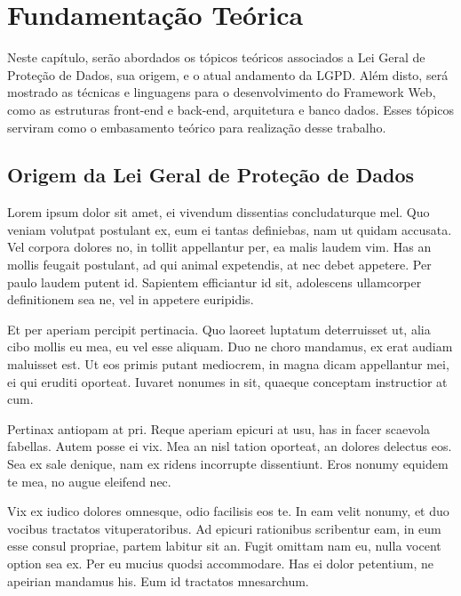 \documentclass[
	12pt,				%
	openright,			%
	oneside,			%
	a4paper,			%
	english,			%
	french,				%
	spanish,			%
	brazil,				%
	]{abntex2}
\begin{document}
\setcounter{chapter}{1}
\chapter{Fundamentação Teórica}
\label{ch: fundamentacao teorica}

Neste capítulo, serão abordados os tópicos teóricos associados a Lei Geral de Proteção de Dados, sua origem, e o atual andamento da LGPD. Além disto, será mostrado as técnicas e linguagens para o desenvolvimento do Framework Web, como as estruturas front-end e back-end, arquitetura e banco dados.
Esses tópicos serviram como o embasamento teórico para realização desse trabalho.

\section{Origem da Lei Geral de Proteção de Dados}
\label{sec: Origem LGPD}

Lorem ipsum dolor sit amet, ei vivendum dissentias concludaturque mel. Quo veniam volutpat postulant ex, eum ei tantas definiebas, nam ut quidam accusata. Vel corpora dolores no, in tollit appellantur per, ea malis laudem vim. Has an mollis feugait postulant, ad qui animal expetendis, at nec debet appetere. Per paulo laudem putent id. Sapientem efficiantur id sit, adolescens ullamcorper definitionem sea ne, vel in appetere euripidis.

Et per aperiam percipit pertinacia. Quo laoreet luptatum deterruisset ut, alia cibo mollis eu mea, eu vel esse aliquam. Duo ne choro mandamus, ex erat audiam maluisset est. Ut eos primis putant mediocrem, in magna dicam appellantur mei, ei qui eruditi oporteat. Iuvaret nonumes in sit, quaeque conceptam instructior at cum.

Pertinax antiopam at pri. Reque aperiam epicuri at usu, has in facer scaevola fabellas. Autem posse ei vix. Mea an nisl tation oporteat, an dolores delectus eos. Sea ex sale denique, nam ex ridens incorrupte dissentiunt. Eros nonumy equidem te mea, no augue eleifend nec.

Vix ex iudico dolores omnesque, odio facilisis eos te. In eam velit nonumy, et duo vocibus tractatos vituperatoribus. Ad epicuri rationibus scribentur eam, in eum esse consul propriae, partem labitur sit an. Fugit omittam nam eu, nulla vocent option sea ex. Per eu mucius quodsi accommodare. Has ei dolor petentium, ne apeirian mandamus his. Eum id tractatos mnesarchum.
\end{document}
